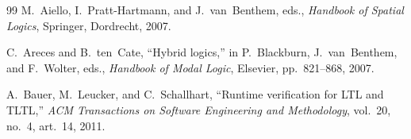 \documentclass[11pt,a4paper]{article}
\theoremstyle{definition}
\theoremstyle{plain}
\theoremstyle{remark}
\begin{document}
\begin{thebibliography}{99}
M.~Aiello, I.~Pratt-Hartmann, and J.~van~Benthem, eds., \emph{Handbook of
Spatial Logics}, Springer, Dordrecht, 2007.

C.~Areces and B.~ten~Cate, ``Hybrid logics,'' in P.~Blackburn,
J.~van~Benthem, and F.~Wolter, eds., \emph{Handbook of Modal Logic},
Elsevier, pp.~821--868, 2007.

A.~Bauer, M.~Leucker, and C.~Schallhart, ``Runtime verification for LTL
and TLTL,'' \emph{ACM Transactions on Software Engineering and
Methodology}, vol.~20, no.~4, art.~14, 2011.

\end{thebibliography}
\end{document}
